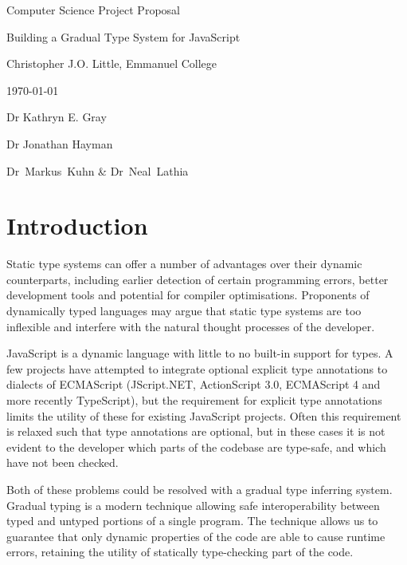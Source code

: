 \documentclass{article}
\begin{document}
	\centerline{\large Computer Science Project Proposal}
	\vspace{0.4in}
	\centerline{\Large Building a Gradual Type System for JavaScript }
	\vspace{0.4in}
	\centerline{\large Christopher J.O. Little, Emmanuel College}
	\vspace{0.3in}
	\centerline{\large \today}
	\vspace{0.3in}

	 Dr Kathryn E. Gray
	\vspace{0.2in}

	 Dr Jonathan Hayman
	\vspace{0.2in}\noindent 
	
	 Dr~Markus~Kuhn \& Dr~Neal~Lathia


	\section{Introduction}\label{prop-introduction}

		Static type systems can offer a number of advantages over their dynamic
		counterparts, including earlier detection of certain programming
		errors, better development tools and potential for compiler
		optimisations. Proponents of dynamically typed languages may argue that
		static type systems are too inflexible and interfere with the natural
		thought processes of the developer.
		
		JavaScript is a dynamic language with little to no built-in support for
		types. A few projects have attempted to integrate optional explicit
		type annotations to dialects of ECMAScript (JScript.NET, ActionScript
		3.0, ECMAScript 4 and more recently TypeScript), but the requirement
		for explicit type annotations limits the utility of these for existing
		JavaScript projects. Often this requirement is relaxed such that type
		annotations are optional, but in these cases it is not evident to the
		developer which parts of the codebase are type-safe, and which have not
		been checked.

		Both of these problems could be resolved with a gradual type inferring
		system. Gradual typing is a modern technique allowing safe
		interoperability between typed and untyped portions of a single
		program. The technique allows us to guarantee that only dynamic
		properties of the code are able to cause runtime errors, retaining the
		utility of statically type-checking part of the code.
		\cite{felleisen06,findler07}
\end{document}
